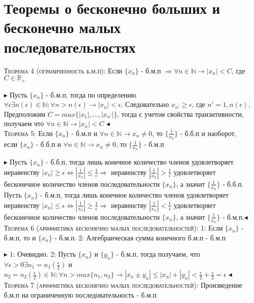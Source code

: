 \documentclass[14pt]{article}
\begin{document}
    \section{Теоремы о бесконечно больших и бесконечно малых последовательностях}
        \textsc{Теорема 4 (ограниченность б.м.п):} Если $\{x_n\}$ - б.м.п $\Rightarrow \forall n \in \mathbb{N} \rightarrow |x_n| <C$, где $C \in \mathbb{R}_+$

        $\blacktriangleright$ Пусть $\{x_n\}$ - б.м.п, тогда по определению $\forall \epsilon \exists n(\epsilon) \in \mathbb{N} : \forall n > n (\epsilon) \rightarrow |x_n| < \epsilon$. Следовательно $x_{n'} \geqslant \epsilon $, где $n'=1,n(\epsilon)$. Предположим $C = max\{|x_1|,...,|x_{n'}|\}$, тогда с учетом свойства транзитивности, получаем что $\forall n \in \mathbb{N} \rightarrow |x_n| < C$ $\blacktriangleleft$ \\
        \textsc{Теорема 5:} Если $\{x_n\}$ - б.м.п и $\forall n \in \mathbb{N} \rightarrow x_n \ne 0$, то $\{\frac{1}{x_n}\}$ - б.б.п и наоборот, если $\{x_n\}$ - б.б.п и $\forall n \in \mathbb{N} \rightarrow x_n \ne 0$, то $\{\frac{1}{x_n}\}$ - б.м.п

        $\blacktriangleright$ Пусть $\{x_n\}$ - б.б.п, тогда лишь конечное количество членов удовлетворяет неравенству $ |x_n| \geqslant \epsilon  \Leftrightarrow |\frac{1}{x_n}| \leqslant \frac{1}{\epsilon} \Rightarrow $ неравенству $|\frac{1}{x_n}| > \frac{1}{\epsilon}$ удовлетворяет бесконечное количество членов последовательности $\{x_n\}$, а значит $\{\frac{1}{x_n}\}$ - б.б.п. Пусть $\{x_n\}$ - б.м.п, тогда лишь конечное количество членов удовлетворяет неравенству $ |x_n|  \leqslant  \epsilon  \Leftrightarrow |\frac{1}{x_n}| \geqslant  \frac{1}{\epsilon} \Rightarrow $ неравенству $|\frac{1}{x_n}| < \frac{1}{\epsilon}$ удовлетворяет бесконечное количество членов последовательности $\{x_n\}$, а значит $\{\frac{1}{x_n}\}$ - б.м.п.$\blacktriangleleft$ \\
        \textsc{Теорема 6 (арифметика бесконечно малых последовательностей):} 1: Если $\{ x_n\} $ - б.м.п, то и $\{x_n\}$ - б.м.п. 2: Алгебраическая сумма конечного б.м.п - б.м.п

        $\blacktriangleright$ 1: Очевидно. 2: Пусть $\{x_n\}$ и $\{y_n\}$ - б.м.п, тогда получаем, что $\forall \epsilon > 0 \exists n_1 =  n_1(\frac{\epsilon}{2})$ и $n_2 = n_2(\frac{\epsilon}{2}) \in \mathbb{N} : \forall n > max\{n_1, n_2\} \rightarrow |x_n \pm y_n| \leqslant |x_n| + |y_n| < \frac{\epsilon}{2} + \frac{\epsilon}{2} = \epsilon$ $\blacktriangleleft$ \\
        \textsc{Теорема 7 (арифметика бесконечно малых последовательностей):} Произведение б.м.п на ограниченную последовательность - б.м.п 
        
\end{document}
